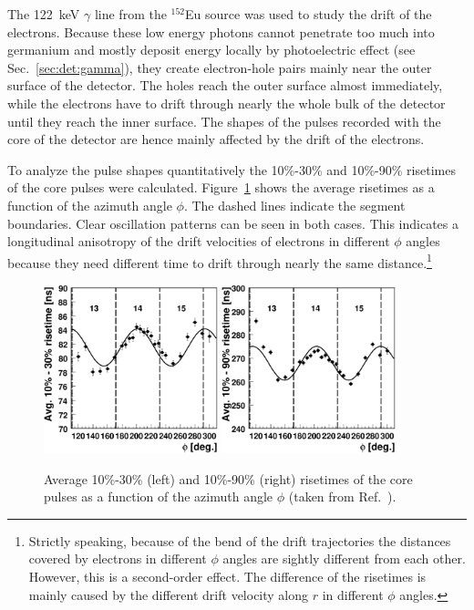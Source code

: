 The 122~keV $\gamma$ line from the $^{152}$Eu source was used to study the drift of the electrons. Because these low energy photons cannot penetrate too much into germanium and mostly deposit energy locally by photoelectric effect (see Sec.~\ref{sec:det:gamma}), they create electron-hole pairs mainly near the outer surface of the detector. The holes reach the outer surface almost immediately, while the electrons have to drift through nearly the whole bulk of the detector until they reach the inner surface. The shapes of the pulses recorded with the core of the detector are hence mainly affected by the drift of the electrons. 

To analyze the pulse shapes quantitatively the 10\%-30\% and 10\%-90\% risetimes of the core pulses were calculated. Figure~\ref{fig:psa:rt10} shows the average risetimes as a function of the azimuth angle $\phi$. The dashed lines indicate the segment boundaries. Clear oscillation patterns can be seen in both cases. This indicates a longitudinal anisotropy of the drift velocities of electrons in different $\phi$ angles because they need different time to drift through nearly the same distance.\footnote{Strictly speaking, because of the bend of the drift trajectories the distances covered by electrons in different $\phi$ angles are sightly different from each other. However, this is a second-order effect. The difference of the risetimes is mainly caused by the different drift velocity along $r$ in different $\phi$ angles.}

\begin{figure}[htbp]
\centering
\includegraphics[width=0.45\textwidth]{phi_risetime1030}
\includegraphics[width=0.45\textwidth]{phi_risetime1090}
\caption{Average 10\%-30\% (left) and 10\%-90\% (right) risetimes of the core pulses as a function of the azimuth angle $\phi$ (taken from Ref.~\cite{Sie07}).}
\label{fig:psa:rt10}
\end{figure}

